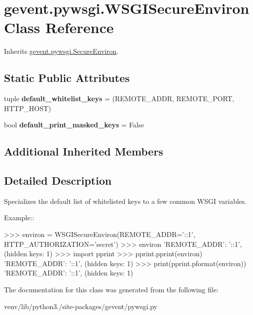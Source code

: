 \hypertarget{classgevent_1_1pywsgi_1_1_w_s_g_i_secure_environ}{}\section{gevent.\+pywsgi.\+W\+S\+G\+I\+Secure\+Environ Class Reference}
\label{classgevent_1_1pywsgi_1_1_w_s_g_i_secure_environ}


Inherits \hyperlink{classgevent_1_1pywsgi_1_1_secure_environ}{gevent.\+pywsgi.\+Secure\+Environ}.

\subsection*{Static Public Attributes}
\begin{DoxyCompactItemize}
\item 
\mbox{\label{classgevent_1_1pywsgi_1_1_w_s_g_i_secure_environ_a4b90eda73a68bdf385ed343d543318d1}} 
tuple {\bfseries default\+\_\+whitelist\+\_\+keys} = (\textquotesingle{}R\+E\+M\+O\+T\+E\+\_\+\+A\+D\+DR\textquotesingle{}, \textquotesingle{}R\+E\+M\+O\+T\+E\+\_\+\+P\+O\+RT\textquotesingle{}, \textquotesingle{}H\+T\+T\+P\+\_\+\+H\+O\+ST\textquotesingle{})
\item 
\mbox{\label{classgevent_1_1pywsgi_1_1_w_s_g_i_secure_environ_aa999a69d264eae1f70ecabb24d09ae74}} 
bool {\bfseries default\+\_\+print\+\_\+masked\+\_\+keys} = False
\end{DoxyCompactItemize}
\subsection*{Additional Inherited Members}


\subsection{Detailed Description}
\begin{DoxyVerb}Specializes the default list of whitelisted keys to a few
common WSGI variables.

Example::

   >>> environ = WSGISecureEnviron(REMOTE_ADDR='::1', HTTP_AUTHORIZATION='secret')
   >>> environ
   {'REMOTE_ADDR': '::1', (hidden keys: 1)}
   >>> import pprint
   >>> pprint.pprint(environ)
   {'REMOTE_ADDR': '::1', (hidden keys: 1)}
   >>> print(pprint.pformat(environ))
   {'REMOTE_ADDR': '::1', (hidden keys: 1)}
\end{DoxyVerb}
 

The documentation for this class was generated from the following file\+:\begin{DoxyCompactItemize}
\item 
venv/lib/python3./site-\/packages/gevent/pywsgi.\+py\end{DoxyCompactItemize}
